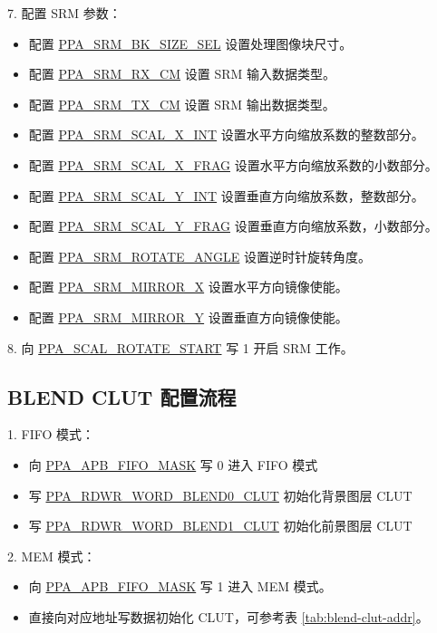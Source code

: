 \documentclass[main\_\_CN.tex]{subfiles}
\begin{document}
7. 配置 SRM 参数：
\begin{itemize}
    \item 配置 \hyperref[fielddesc:PPASRMBKSIZESEL]{PPA\_SRM\_BK\_SIZE\_SEL} 设置处理图像块尺寸。
    \item 配置 \hyperref[fielddesc:PPASRMRXCM]{PPA\_SRM\_RX\_CM} 设置 SRM 输入数据类型。
    \item 配置 \hyperref[fielddesc:PPASRMTXCM]{PPA\_SRM\_TX\_CM} 设置 SRM 输出数据类型。
    \item 配置 \hyperref[fielddesc:PPASRMSCALXINT]{PPA\_SRM\_SCAL\_X\_INT} 设置水平方向缩放系数的整数部分。
    \item 配置 \hyperref[fielddesc:PPASRMSCALXFRAG]{PPA\_SRM\_SCAL\_X\_FRAG} 设置水平方向缩放系数的小数部分。
    \item 配置 \hyperref[fielddesc:PPASRMSCALYINT]{PPA\_SRM\_SCAL\_Y\_INT} 设置垂直方向缩放系数，整数部分。
    \item 配置 \hyperref[fielddesc:PPASRMSCALYFRAG]{PPA\_SRM\_SCAL\_Y\_FRAG} 设置垂直方向缩放系数，小数部分。
    \item 配置 \hyperref[fielddesc:PPASRMROTATEANGLE]{PPA\_SRM\_ROTATE\_ANGLE} 设置逆时针旋转角度。
    \item 配置 \hyperref[fielddesc:PPASRMMIRRORX]{PPA\_SRM\_MIRROR\_X} 设置水平方向镜像使能。
    \item 配置 \hyperref[fielddesc:PPASRMMIRRORY]{PPA\_SRM\_MIRROR\_Y} 设置垂直方向镜像使能。
\end{itemize}

8. 向 \hyperref[fielddesc:PPASCALROTATESTART]{PPA\_SCAL\_ROTATE\_START} 写 1 开启 SRM 工作。

\subsection{BLEND CLUT 配置流程}
\label{sec: ppa_blend_clut_config}
1. FIFO 模式：

\begin{itemize}
    \item 向 \hyperref[fielddesc:PPAAPBFIFOMASK]{PPA\_APB\_FIFO\_MASK} 写 0 进入 FIFO 模式
    \item 写 \hyperref[fielddesc:PPARDWRWORDBLEND0CLUT]{PPA\_RDWR\_WORD\_BLEND0\_CLUT} 初始化背景图层 CLUT
    \item 写 \hyperref[fielddesc:PPARDWRWORDBLEND1CLUT]{PPA\_RDWR\_WORD\_BLEND1\_CLUT} 初始化前景图层 CLUT
\end{itemize}
2. MEM 模式：

\begin{itemize}
    \item 向 \hyperref[fielddesc:PPAAPBFIFOMASK]{PPA\_APB\_FIFO\_MASK} 写 1 进入 MEM 模式。
    \item 直接向对应地址写数据初始化 CLUT，可参考表 \ref{tab:blend-clut-addr}。
\end{itemize}
\end{document}
